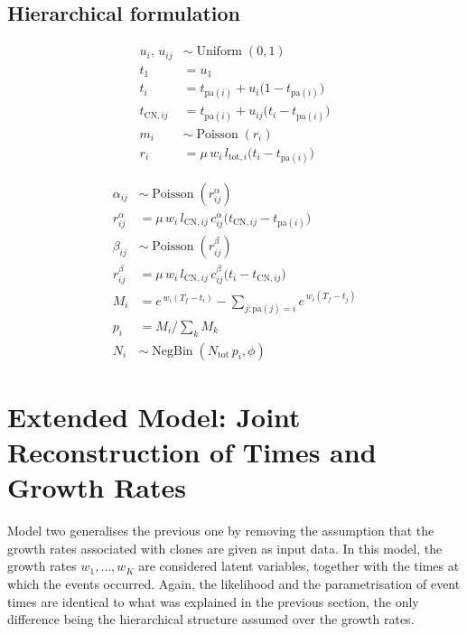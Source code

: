 \subsection{Hierarchical formulation}
\begin{minipage}[t]{0.49\linewidth}
\[
\begin{aligned}
u_i,\,u_{ij} &\sim \operatorname{Uniform}(0,1)\\
t_1 &= u_1\\
t_i &= t_{\mathrm{pa}(i)}+u_i\bigl(1-t_{\mathrm{pa}(i)}\bigr)\\
t_{\mathrm{CN},ij} &= t_{\mathrm{pa}(i)}+u_{ij}\bigl(t_i-t_{\mathrm{pa}(i)}\bigr)\\
m_i &\sim \operatorname{Poisson}(r_i)\\
r_i &= \mu\,w_i\,l_{\mathrm{tot},i}\bigl(t_i-t_{\mathrm{pa}(i)}\bigr)
\end{aligned}
\]
\end{minipage}\hfill
\begin{minipage}[t]{0.49\linewidth}
\[
\begin{aligned}
\alpha_{ij} &\sim \operatorname{Poisson}(r^\alpha_{ij})\\
r^\alpha_{ij} &= \mu\,w_i\,l_{\mathrm{CN},ij}\,c^\alpha_{ij}\bigl(t_{\mathrm{CN},ij}-t_{\mathrm{pa}(i)}\bigr)\\
\beta_{ij} &\sim \operatorname{Poisson}(r^\beta_{ij})\\
r^\beta_{ij} &= \mu\,w_i\,l_{\mathrm{CN},ij}\,c^\beta_{ij}\bigl(t_i-t_{\mathrm{CN},ij}\bigr)\\
M_i &= e^{\,w_i(T_f-t_i)}-\!\!\sum_{j:\mathrm{pa}(j)=i}\!\! e^{\,w_i(T_f-t_j)}\\
p_i &= M_i\big/\textstyle\sum_{k} M_k\\
N_i &\sim \operatorname{NegBin}(N_{\mathrm{tot}}\,p_i,\phi)
\end{aligned}
\]
\end{minipage}

\clearpage

\section{Extended Model: Joint Reconstruction of Times and Growth Rates}
\label{sec: model rw}
Model two generalises the previous one by removing the assumption that the growth 
rates associated with clones are given as input data. In this model, the growth 
rates $w_1, \ldots, w_K$ are considered latent variables, together with the times 
at which the events occurred. Again, the likelihood and the parametrisation of 
event times are identical to what was explained in the previous section, the only 
difference being the hierarchical structure assumed over the growth rates.

